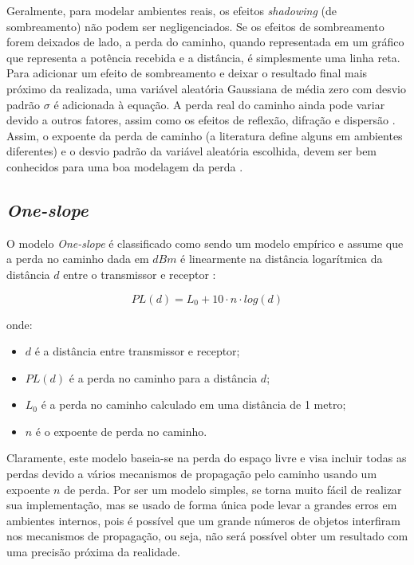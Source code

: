 \documentclass[
	12pt,				%
	twoside,			%
	a4paper,			%
	english,			%
	french,				%
	spanish,			%
	brazil				%
	]{abntex2}
\begin{document}
Geralmente, para modelar ambientes reais, os efeitos \emph{shadowing}
(de sombreamento) não podem ser negligenciados. Se os efeitos de
sombreamento forem deixados de lado, a perda do caminho, quando
representada em um gráfico que representa a potência recebida e a
distância, é simplesmente uma linha reta. Para adicionar um efeito de
sombreamento e deixar o resultado final mais próximo da realizada, uma
variável aleatória Gaussiana de média zero com desvio padrão \(\sigma\)
é adicionada à equação. A perda real do caminho ainda pode variar devido
a outros fatores, assim como os efeitos de reflexão, difração e
dispersão \cite{RAPPAPORT}. Assim, o expoente da perda de caminho (a
literatura define alguns em ambientes diferentes) e o desvio padrão da
variável aleatória escolhida, devem ser bem conhecidos para uma boa
modelagem da perda \cite{LUO}.

\subsection{\texorpdfstring{\emph{One-slope}}{One-slope}}\label{sec:one_slope}

O modelo \emph{One-slope} é classificado como sendo um modelo empírico e
assume que a perda no caminho dada em \(dBm\) é linearmente na distância
logarítmica da distância \(d\) entre o transmissor e receptor
\cite{LUO}:

\begin{equation}
PL(d) = L_{0} + 10 \cdot n \cdot log(d)
\end{equation}

onde:

\begin{itemize}
\item
  \(d\) é a distância entre transmissor e receptor;
\item
  \(PL(d)\) é a perda no caminho para a distância \(d\);
\item
  \(L_{0}\) é a perda no caminho calculado em uma distância de 1 metro;
\item
  \(n\) é o expoente de perda no caminho.
\end{itemize}

Claramente, este modelo baseia-se na perda do espaço livre e visa
incluir todas as perdas devido a vários mecanismos de propagação pelo
caminho usando um expoente \(n\) de perda. Por ser um modelo simples, se
torna muito fácil de realizar sua implementação, mas se usado de forma
única pode levar a grandes erros em ambientes internos, pois é possível
que um grande números de objetos interfiram nos mecanismos de
propagação, ou seja, não será possível obter um resultado com uma
precisão próxima da realidade.
\end{document}
